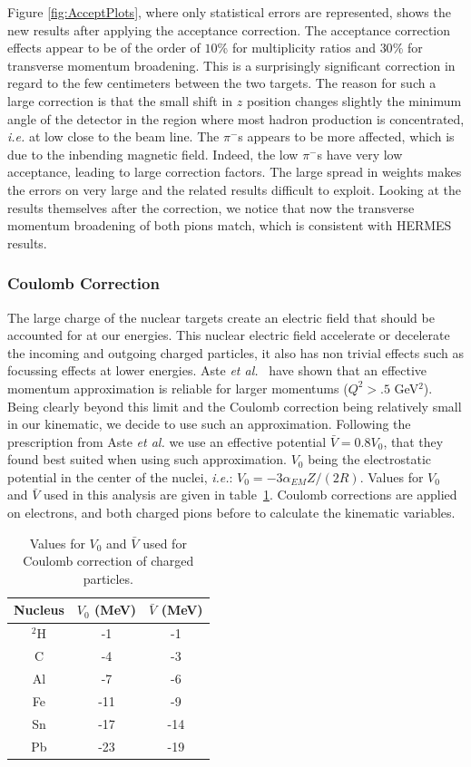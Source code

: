 Figure \ref{fig:AcceptPlots}, where only statistical errors are 
represented, shows the new results after applying the acceptance correction.
The acceptance correction effects appear to be of the order of $10$\% for 
multiplicity ratios and 
$30$\% for transverse momentum broadening. This is a surprisingly 
significant correction in regard to the few centimeters between the two targets. 
The reason for such a large correction is that the small shift in $z$ position changes 
slightly the minimum angle of the detector in the region where most hadron production 
is concentrated, {\it i.e.} at low \pt close to the beam line. The 
$\pi^-$s appears to be more affected, which is due to the inbending magnetic 
field. Indeed, the low \pt $\pi^-$s have very low acceptance, leading to large 
correction factors. The large spread in weights makes the errors 
on \dpt very large and the related results difficult to exploit. 
Looking at the results themselves after the correction, we notice that now 
the transverse momentum broadening of both pions match, which is consistent 
with HERMES results.

\subsubsection{Coulomb Correction}
\label{CCor}

The large charge of the nuclear targets create an electric field that should 
be accounted for at our energies. This nuclear electric field accelerate or 
decelerate the incoming and outgoing charged particles, it also has non 
trivial effects such as focussing effects at lower energies. Aste {\it et 
al.}~\cite{Aste:2005wc} have shown that an effective momentum approximation is 
reliable for larger momentums ($Q^2>.5$ GeV$^2$). Being clearly beyond this 
limit and the Coulomb correction being relatively small in our kinematic, we 
decide to use such an approximation. Following the prescription from Aste 
{\it et al.} we use an effective potential $\bar V= 0.8 V_0$, that they found 
best suited when using such approximation. $V_0$ being the electrostatic 
potential in the center of the nuclei, {\it i.e.}: $V_0= -3 \alpha_{EM} Z / 
(2 R)$. Values for $V_0$ and $\bar V$ used in this analysis are given in 
table~\ref{tab:Coulomb}. Coulomb corrections are applied on electrons, and
both charged pions before to calculate the kinematic variables.

\begin{table}[htbp]
  \centering
  \begin{tabular}{@{} ccc @{}}
    \hline
Nucleus & $V_0$ (MeV)  &  $\bar V$ (MeV) \\ \hline
$^2$H  & -1  &     -1 \\
C   &  -4 &      -3 \\
Al  &  -7 &      -6 \\
Fe  & -11 &    -9 \\
Sn  & -17 &   -14 \\
Pb  & -23 &   -19 \\
    \hline
  \end{tabular}
  \caption{Values for $V_0$ and $\bar V$ used for Coulomb correction of charged particles.}
  \label{tab:Coulomb}
\end{table}



